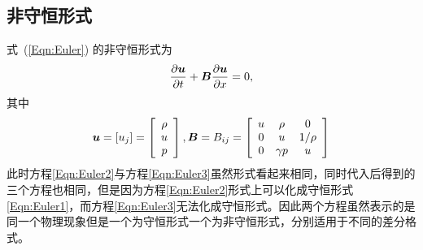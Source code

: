 \documentclass[10.5pt
]{article}
\begin{document}
\subsection{非守恒形式}
式~(\ref{Eqn:Euler}) 的非守恒形式为
\begin{align}
\pdv{\vb*u}{t} + \vb*B \pdv{\vb*u}{x} = 0,
\label{Eqn:Euler3}
\end{align}
其中
\begin{align}
\vb*u = [u_j] = \left[\begin{array}{c}\rho\\ u\\ p\end{array}\right], \vb*B = B_{ij} = \left[\begin{array}{ccc}u & \rho & 0\\
0 & u & 1/\rho\\ 0 & \gamma p & u\end{array}\right]
\end{align}
此时方程\ref{Eqn:Euler2}与方程\ref{Eqn:Euler3}虽然形式看起来相同，同时代入后得到的三个方程也相同，但是因为方程\ref{Eqn:Euler2}形式上可以化成守恒形式\ref{Eqn:Euler1}，而方程\ref{Eqn:Euler3}无法化成守恒形式。因此两个方程虽然表示的是同一个物理现象但是一个为守恒形式一个为非守恒形式，分别适用于不同的差分格式。
\end{document}
